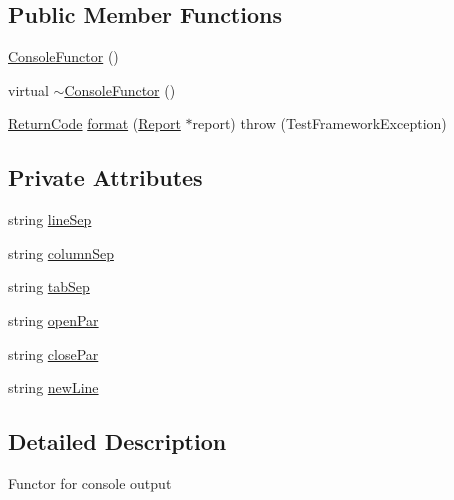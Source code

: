 \subsection*{Public Member Functions}
\begin{DoxyCompactItemize}
\item 
\hyperlink{classit_1_1testbench_1_1formatter_1_1ConsoleFunctor_ab0c9c44c54b8ac2d7c563ffc6b36ba55}{Console\-Functor} ()
\item 
virtual \hyperlink{classit_1_1testbench_1_1formatter_1_1ConsoleFunctor_a401133dc48dcac46f5f34cfe1b58dc45}{$\sim$\-Console\-Functor} ()
\item 
\hyperlink{structit_1_1testbench_1_1data_1_1ReturnCode}{Return\-Code} \hyperlink{classit_1_1testbench_1_1formatter_1_1ConsoleFunctor_ab61212bcbf0fd24147484fbdb89bcd24}{format} (\hyperlink{classit_1_1testbench_1_1data_1_1Report}{Report} $\ast$report)  throw (\-Test\-Framework\-Exception)
\end{DoxyCompactItemize}
\subsection*{Private Attributes}
\begin{DoxyCompactItemize}
\item 
string \hyperlink{classit_1_1testbench_1_1formatter_1_1ConsoleFunctor_ad15df0e58f3ccd2719a32aa224ae0c69}{line\-Sep}
\item 
string \hyperlink{classit_1_1testbench_1_1formatter_1_1ConsoleFunctor_aa30f110e86c06bf7126e1dca275d8a2b}{column\-Sep}
\item 
string \hyperlink{classit_1_1testbench_1_1formatter_1_1ConsoleFunctor_a01ae95da7ab7c9ca2f1bbfc2ab75994b}{tab\-Sep}
\item 
string \hyperlink{classit_1_1testbench_1_1formatter_1_1ConsoleFunctor_a24b520f4b3dd76076844874a92bd5102}{open\-Par}
\item 
string \hyperlink{classit_1_1testbench_1_1formatter_1_1ConsoleFunctor_aae83219f2eaf5db95fcf1356e35dd765}{close\-Par}
\item 
string \hyperlink{classit_1_1testbench_1_1formatter_1_1ConsoleFunctor_aa10735dbd1a676f0bfa646b713381b10}{new\-Line}
\end{DoxyCompactItemize}


\subsection{Detailed Description}
Functor for console output 


